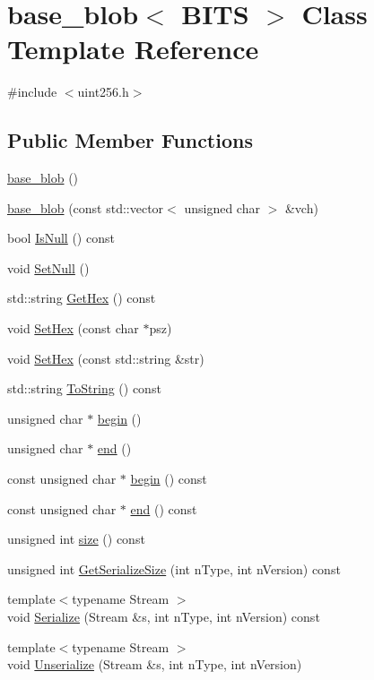 \hypertarget{classbase__blob}{}\section{base\+\_\+blob$<$ B\+I\+T\+S $>$ Class Template Reference}
\label{classbase__blob}


{\ttfamily \#include $<$uint256.\+h$>$}

\subsection*{Public Member Functions}
\begin{DoxyCompactItemize}
\item 
\hyperlink{classbase__blob_ada7be83089951dc9438f384c0587cf29}{base\+\_\+blob} ()
\item 
\hyperlink{classbase__blob_a874bc08d9039eb202fb2ab95dd9f49a0}{base\+\_\+blob} (const std\+::vector$<$ unsigned char $>$ \&vch)
\item 
bool \hyperlink{classbase__blob_aff2f3d1d623d91b6895a6a153434770e}{Is\+Null} () const 
\item 
void \hyperlink{classbase__blob_aa340be5328d911272eded433d03f30a3}{Set\+Null} ()
\item 
std\+::string \hyperlink{classbase__blob_a9541747b1f91f9469ac0aff90665bd32}{Get\+Hex} () const 
\item 
void \hyperlink{classbase__blob_a5ec1f681a2830f4e180fe664c0eb4dd0}{Set\+Hex} (const char $\ast$psz)
\item 
void \hyperlink{classbase__blob_a5df0a1d46bdf167b4e2dc7c7068ff53a}{Set\+Hex} (const std\+::string \&str)
\item 
std\+::string \hyperlink{classbase__blob_a1a26b5da921f48b09b228d1bfda05088}{To\+String} () const 
\item 
unsigned char $\ast$ \hyperlink{classbase__blob_aeee68e00ceeacf49086e98b661e017ff}{begin} ()
\item 
unsigned char $\ast$ \hyperlink{classbase__blob_ab60d34d18e5b5f74d285480f7b3db00c}{end} ()
\item 
const unsigned char $\ast$ \hyperlink{classbase__blob_ae0cb02356abee204d1e86da2b0842745}{begin} () const 
\item 
const unsigned char $\ast$ \hyperlink{classbase__blob_a9f2fb60d0014cdc1afda230cfa8f7f7d}{end} () const 
\item 
unsigned int \hyperlink{classbase__blob_a449c3f902fcab7af6c74aa9fee099542}{size} () const 
\item 
unsigned int \hyperlink{classbase__blob_ae88b1782486e704927aa10ae20c491a9}{Get\+Serialize\+Size} (int n\+Type, int n\+Version) const 
\item 
{\footnotesize template$<$typename Stream $>$ }\\void \hyperlink{classbase__blob_ac9ccfed4de6210801d4dbede71ad8ba6}{Serialize} (Stream \&s, int n\+Type, int n\+Version) const 
\item 
{\footnotesize template$<$typename Stream $>$ }\\void \hyperlink{classbase__blob_a3d3f418c65801267e8de23d9367532c0}{Unserialize} (Stream \&s, int n\+Type, int n\+Version)
\end{DoxyCompactItemize}
